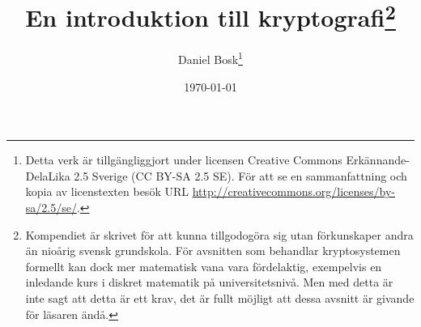 \documentclass[a4paper]{article}
\author{Daniel Bosk\thanks{%
	Detta verk är tillgängliggjort under licensen Creative Commons 
	Erkännande-DelaLika 2.5 Sverige (CC BY-SA 2.5 SE).
	För att se en sammanfattning och kopia av licenstexten besök URL 
	\url{http://creativecommons.org/licenses/by-sa/2.5/se/}.
}}
\title{En introduktion till kryptografi\thanks{%
  Kompendiet är skrivet för att kunna tillgodogöra sig utan förkunskaper andra 
  än nioårig svensk grundskola.
  För avsnitten som behandlar kryptosystemen formellt kan dock mer matematisk 
  vana vara fördelaktig, exempelvis en inledande kurs i diskret matematik på 
  universitetsnivå.
  Men med detta är inte sagt att detta är ett krav, det är fullt möjligt att 
  dessa avsnitt är givande för läsaren ändå.
}}
\date{\today}
\theoremstyle{definition}
\theoremstyle{remark}
\begin{document}
\maketitle
\tableofcontents
\clearpage










\printbibliography{}
\end{document}
